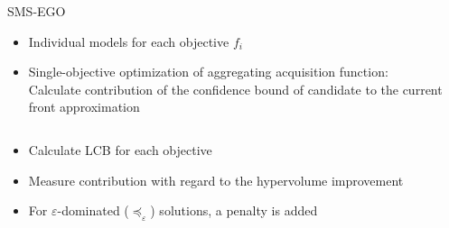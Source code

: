 \documentclass[11pt,compress,t,notes=noshow, xcolor=table]{beamer}
\begin{document}
\begin{frame}{SMS-EGO}

\begin{itemize}
\item Individual models for each objective $f_i$
\item Single-objective optimization of aggregating acquisition function: \\
  Calculate contribution of the confidence bound of candidate to the current front approximation
\end{itemize}

\begin{columns}

\begin{column}{0.55\textwidth}
\begin{itemize}
  \item Calculate LCB for each objective
  \item Measure contribution with regard to the hypervolume improvement
  \item For $\varepsilon$-dominated ($\preceq_{\varepsilon}$) solutions, a penalty is added
\end{itemize}
\vfill
\end{column}

\begin{column}{0.45\textwidth}


\end{column}
\end{columns}
\end{frame}
\end{document}
